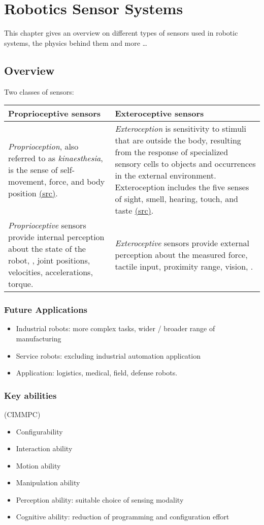 \chapter{Robotics Sensor Systems}
This chapter gives an overview on different types of sensors used in robotic systems, the physics behind them and more \dots

\section{Overview}
Two classes of sensors:
\begin{table}[hbt!]
	\centering
	\begin{tabular}{p{8cm}|p{8cm}}
		Proprioceptive sensors & Exteroceptive sensors \\\hline\hline
		\textit{Proprioception}, also referred to as \textit{kinaesthesia}, is the sense of self-movement, force, and body position \href{https://en.wikipedia.org/wiki/Proprioception}{(src)}. & \textit{Exteroception} is sensitivity to stimuli that are outside the body, resulting from the response of specialized sensory cells to objects and occurrences in the external environment. Exteroception includes the five senses of sight, smell, hearing, touch, and taste \href{https://dictionary.apa.org/exteroception}{(src)}.\\ \hline
		\textit{Proprioceptive} sensors provide internal perception about the state of the robot, \ie, joint positions, velocities, accelerations, torque. & \textit{Exteroceptive} sensors provide external perception about the measured force, tactile input, proximity range, vision, \etc.
	\end{tabular}
\end{table}

\subsection{Future Applications}
\begin{itemize}
	\item Industrial robots: more complex tasks, wider / broader range of manufacturing
	\item Service robots: excluding industrial automation application
	\item Application: logistics, medical, field, defense robots.
\end{itemize}

\subsection{Key abilities} (CIMMPC)
\begin{itemize}
	\item Configurability
	\item Interaction ability
	\item Motion ability
	\item Manipulation ability
	\item Perception ability: suitable choice of sensing modality
	\item Cognitive ability: reduction of programming and configuration effort
\end{itemize}

